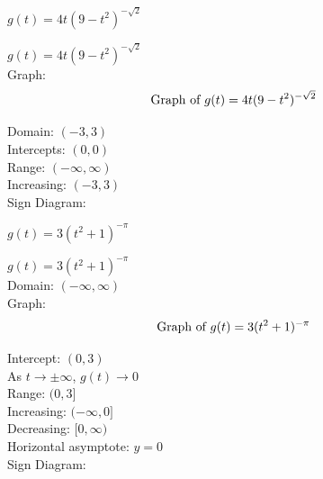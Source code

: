 \documentclass{ximera}
\begin{document}
\begin{question}
\begin{problem} $g(t) = 4t (9-t^2)^{-\sqrt{2}}$

\begin{solution}
$g(t) = 4t (9-t^2)^{-\sqrt{2}}$\\
Graph: \\

$$\text{Graph of $g(t)=4t(9-t^2)^{-\sqrt{2}}$}$$

 Domain: $(-3, 3)$\\
Intercepts: $(0,0)$\\
Range: $(-\infty, \infty)$\\
Increasing: $(-3,3)$ \\
Sign Diagram:\\
\begin{image}
\end{image}
\end{solution}
\end{problem}


\begin{problem}\label{powerfcngraphexlast} $g(t) = 3(t^2+1)^{-\pi}$

\begin{solution}
$g(t) = 3(t^2+1)^{-\pi}$ \\
Domain: $(-\infty, \infty)$\\
Graph: \\

$$\text{Graph of $g(t)=3(t^2+1)^{-\pi}$}$$

Intercept: $(0,3)$\\
As $t \rightarrow \pm \infty$, $g(t) \rightarrow 0$ \\
Range: $(0, 3]$\\
Increasing: $(-\infty, 0]$ \\
Decreasing: $[0, \infty)$\\
Horizontal asymptote:  $y =0$\\
Sign Diagram:\\
\begin{image}
\end{image}
\end{solution}
\end{problem}

\end{question}
\end{document}
